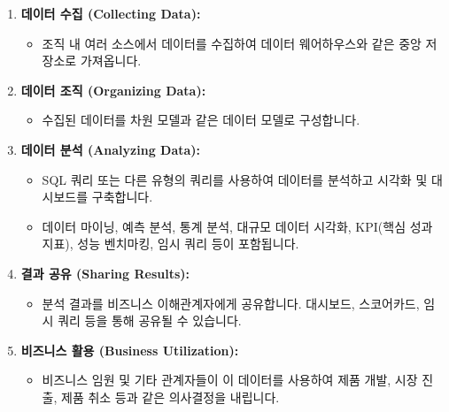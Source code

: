\documentclass[11pt,a4paper]{article}
\theoremstyle{definition}
\begin{document}
\begin{enumerate}
    \item \textbf{데이터 수집 (Collecting Data):}
    \begin{itemize}
        \item 조직 내 여러 소스에서 데이터를 수집하여 데이터 웨어하우스와 같은 중앙 저장소로 가져옵니다.
    \end{itemize}
    \item \textbf{데이터 조직 (Organizing Data):}
    \begin{itemize}
        \item 수집된 데이터를 차원 모델과 같은 데이터 모델로 구성합니다.
    \end{itemize}
    \item \textbf{데이터 분석 (Analyzing Data):}
    \begin{itemize}
        \item SQL 쿼리 또는 다른 유형의 쿼리를 사용하여 데이터를 분석하고 시각화 및 대시보드를 구축합니다.
        \item 데이터 마이닝, 예측 분석, 통계 분석, 대규모 데이터 시각화, KPI(핵심 성과 지표), 성능 벤치마킹, 임시 쿼리 등이 포함됩니다.
    \end{itemize}
    \item \textbf{결과 공유 (Sharing Results):}
    \begin{itemize}
        \item 분석 결과를 비즈니스 이해관계자에게 공유합니다. 대시보드, 스코어카드, 임시 쿼리 등을 통해 공유될 수 있습니다.
    \end{itemize}
    \item \textbf{비즈니스 활용 (Business Utilization):}
    \begin{itemize}
        \item 비즈니스 임원 및 기타 관계자들이 이 데이터를 사용하여 제품 개발, 시장 진출, 제품 취소 등과 같은 의사결정을 내립니다.
    \end{itemize}
\end{enumerate}
\end{document}
